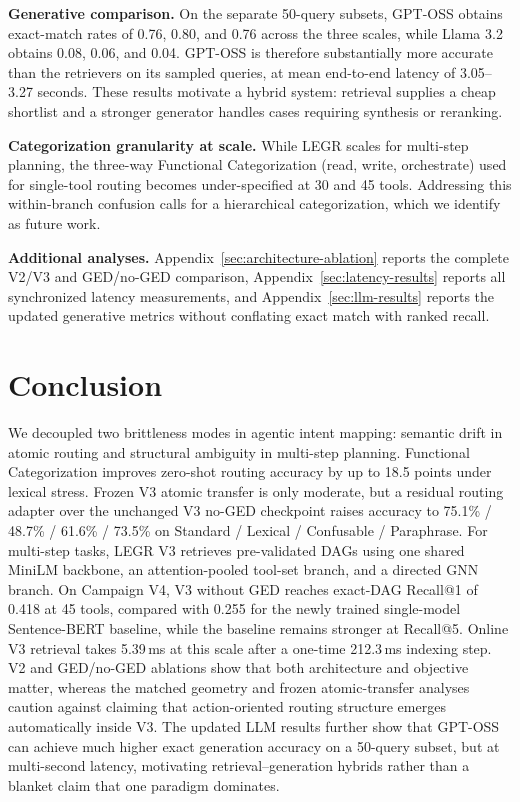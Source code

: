 \documentclass{article}
\begin{document}
\textbf{Generative comparison.} On the separate 50-query subsets, GPT-OSS obtains exact-match rates of 0.76, 0.80, and 0.76 across the three scales, while Llama 3.2 obtains 0.08, 0.06, and 0.04. GPT-OSS is therefore substantially more accurate than the retrievers on its sampled queries, at mean end-to-end latency of 3.05--3.27 seconds. These results motivate a hybrid system: retrieval supplies a cheap shortlist and a stronger generator handles cases requiring synthesis or reranking.

\textbf{Categorization granularity at scale.} While LEGR scales for multi-step planning, the three-way Functional Categorization (read, write, orchestrate) used for single-tool routing becomes under-specified at 30 and 45 tools. Addressing this within-branch confusion calls for a hierarchical categorization, which we identify as future work.

\textbf{Additional analyses.} Appendix~\ref{sec:architecture-ablation} reports the complete V2/V3 and GED/no-GED comparison, Appendix~\ref{sec:latency-results} reports all synchronized latency measurements, and Appendix~\ref{sec:llm-results} reports the updated generative metrics without conflating exact match with ranked recall.


\section{Conclusion}

We decoupled two brittleness modes in agentic intent mapping: semantic drift in atomic routing and structural ambiguity in multi-step planning. Functional Categorization improves zero-shot routing accuracy by up to 18.5 points under lexical stress. Frozen V3 atomic transfer is only moderate, but a residual routing adapter over the unchanged V3 no-GED checkpoint raises accuracy to 75.1\% / 48.7\% / 61.6\% / 73.5\% on Standard / Lexical / Confusable / Paraphrase. For multi-step tasks, LEGR V3 retrieves pre-validated DAGs using one shared MiniLM backbone, an attention-pooled tool-set branch, and a directed GNN branch. On Campaign V4, V3 without GED reaches exact-DAG Recall@1 of 0.418 at 45 tools, compared with 0.255 for the newly trained single-model Sentence-BERT baseline, while the baseline remains stronger at Recall@5. Online V3 retrieval takes 5.39\,ms at this scale after a one-time 212.3\,ms indexing step. V2 and GED/no-GED ablations show that both architecture and objective matter, whereas the matched geometry and frozen atomic-transfer analyses caution against claiming that action-oriented routing structure emerges automatically inside V3. The updated LLM results further show that GPT-OSS can achieve much higher exact generation accuracy on a 50-query subset, but at multi-second latency, motivating retrieval--generation hybrids rather than a blanket claim that one paradigm dominates.
\end{document}
